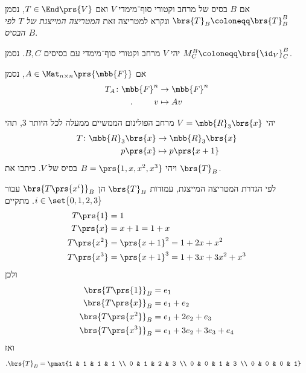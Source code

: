\documentclass[a4paper,10pt,twoside,openany]{book}
\begin{document}
\begin{notation}
אם
$B$
בסיס של מרחב וקטורי סוף־מימדי
$V$
ואם
$T \in \End\prs{V}$,
נסמן
$\brs{T}_B \coloneqq \brs{T}^B_B$
ונקרא למטריצה זאת
\emph{המטריצה המייצגת של
$T$
לפי הבסיס
$B$}.
\end{notation}

\begin{notation}
יהי
$V$
מרחב וקטורי סוף־מימדי עם בסיסים
$B,C$.
נסמן
$M^B_C \coloneqq \brs{\id_V}^B_C$.
\end{notation}

\begin{notation}
אם
$A \in \Mat_{n\times n}\prs{\mbb{F}}$,
נסמן
\begin{align*}
T_A \colon \mbb{F}^n &\to \mbb{F}^n \\
\text{.} \hphantom{lalala} v &\mapsto Av
\end{align*}
\end{notation}

\begin{exercise}\label{ex:p(x+1)}
יהי
$V = \mbb{R}_3\brs{x}$
מרחב הפולינום הממשיים ממעלה לכל היותר
$3$,
תהי
\begin{align*}
T \colon \mbb{R}_3\brs{x} &\to \mbb{R}_3\brs{x} \\
p\prs{x} &\mapsto p\prs{x+1}
\end{align*}
ויהי
$B = \prs{1,x,x^2,x^3}$
בסיס של
$V$.
כיתבו את
$\brs{T}_B$.
\end{exercise}

\begin{solution}
לפי הגדרת המטריצה המייצגת,
עמודות
$\brs{T}_B$
הן
$\brs{T\prs{x^i}}_B$
עבור
$i \in \set{0,1,2,3}$.
מתקיים
\begin{align*}
T\prs{1} &= 1 \\
T\prs{x} &= x+1 = 1 + x \\
T\prs{x^2} &= \prs{x+1}^2 = 1 + 2x + x^2 \\
T\prs{x^3} &= \prs{x+1}^3 = 1 + 3x + 3x^2 + x^3
\end{align*}
ולכן
\begin{align*}
\brs{T\prs{1}}_B &= e_1 \\
\brs{T\prs{x}}_B &= e_1 + e_2 \\
\brs{T\prs{x^2}}_B &= e_1 + 2 e_2 + e_3 \\
\brs{T\prs{x^3}}_B &= e_1 + 3 e_2 + 3 e_3 + e_4
\end{align*}
ואז
\begin{align*}
\text{.} \brs{T}_B &= \pmat{1 & 1 & 1 & 1 \\ 0 & 1 & 2 & 3 \\ 0 & 0 & 1 & 3 \\ 0 & 0 & 0 & 1}
\end{align*}
\end{solution}
\end{document}
